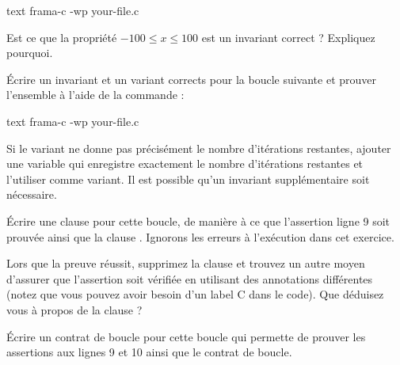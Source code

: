 \begin{CodeBlock}{text}
frama-c -wp your-file.c
\end{CodeBlock}




Est ce que la propriété $-100 \leq x \leq 100$ est un invariant correct ?
Expliquez pourquoi.





Écrire un invariant et un variant corrects pour la boucle suivante et prouver
l'ensemble à l'aide de la commande :

\begin{CodeBlock}{text}
frama-c -wp your-file.c
\end{CodeBlock}




Si le variant ne donne pas précisément le nombre d'itérations restantes, ajouter
une variable qui enregistre exactement le nombre d'itérations restantes et l'utiliser
comme variant. Il est possible qu'un invariant supplémentaire soit nécessaire.





Écrire une clause  pour cette boucle, de manière à ce
que l'assertion ligne 9 soit prouvée ainsi que la clause .
Ignorons les erreurs à l'exécution dans cet exercice.





Lors que la preuve réussit, supprimez la clause  et
trouvez un autre moyen d'assurer que l'assertion soit vérifiée en utilisant des
annotations différentes (notez que vous pouvez avoir besoin d'un label C dans le
code). Que déduisez vous à propos de la clause  ?




Écrire un contrat de boucle pour cette boucle qui permette de prouver les
assertions aux lignes 9 et 10 ainsi que le contrat de boucle.


